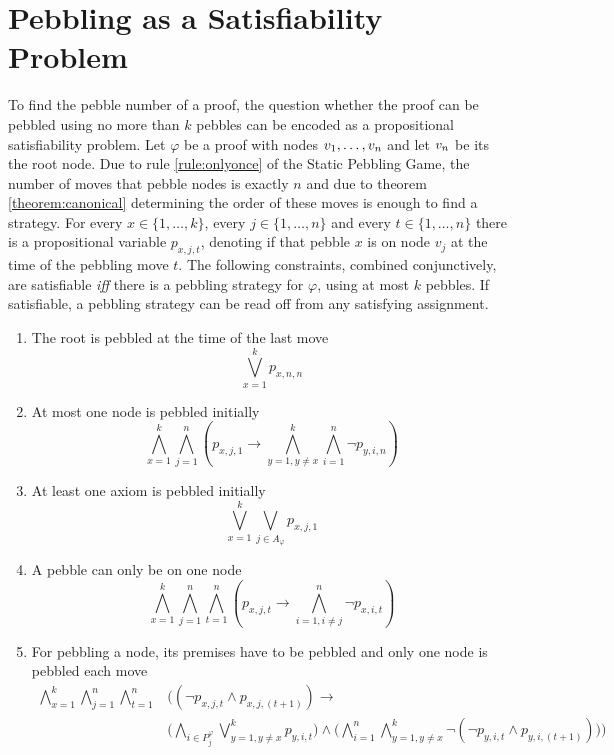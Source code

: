\documentclass{llncs}
\newcommand{\Premises}[2]{P_{#1}^{#2}}
\newcommand{\Axioms}[1]{A_{#1}}
\begin{document}
\section{Pebbling as a Satisfiability Problem}
\label{sec:PebblingAsSat}

To find the pebble number of a proof, the question whether the proof can be pebbled using no more than $k$ pebbles can be encoded as a propositional satisfiability problem.
Let $\varphi$ be a proof with nodes $v_1,\ldots,v_n$ and let $v_n$ be its the root node. 
Due to rule \ref{rule:onlyonce} of the Static Pebbling Game, the number of moves that pebble nodes is exactly $n$ and due to theorem \ref{theorem:canonical} determining the order of these moves is enough to find a strategy. For every $x \in \{1,\ldots,k\}$, every $j \in \{1,\ldots,n\}$ and every $t \in \{1,\ldots,n\}$ there is a propositional variable $p_{x,j,t}$, denoting if that pebble $x$ is on node $v_j$ at the time of the pebbling move $t$. The following constraints, combined conjunctively, are satisfiable \textit{iff} there is a pebbling strategy for $\varphi$, using at most $k$ pebbles. If satisfiable, a pebbling strategy can be read off from any satisfying assignment.

\begin{enumerate}
	\item The root is pebbled at the time of the last move
				$$\bigvee_{x = 1}^k p_{x,n,n}$$
				
	\item At most one node is pebbled initially\\
				$$\bigwedge_{x = 1}^k \bigwedge_{j = 1}^n \left( p_{x,j,1} \rightarrow \bigwedge_{y = 1, y \neq x}^k \bigwedge_{i = 1}^n \neg p_{y,i,n} \right)$$
	
	\item At least one axiom is pebbled initially\\
				$$\bigvee_{x = 1}^k \bigvee_{j \in \Axioms{\varphi}} p_{x,j,1}$$
				
	\item A pebble can only be on one node
				$$\bigwedge_{x = 1}^k \bigwedge_{j = 1}^n \bigwedge_{t = 1}^n \left( p_{x,j,t} \rightarrow \bigwedge_{i = 1, i \neq j}^n \neg p_{x,i,t} \right)$$ 
				
	\item \label{c:pebble} For pebbling a node, its premises have to be pebbled and only one node is pebbled each move\\
				\begin{align*}
					\bigwedge_{x = 1}^k \bigwedge_{j = 1}^n \bigwedge_{t = 1}^n & \Bigg( \left(\neg p_{x,j,t} \wedge p_{x,j,(t+1)} \right)\rightarrow \\
					&\bigg( \bigwedge_{i \in \Premises{j}{\varphi}} \bigvee_{y = 1, y \neq x}^k p_{y,i,t} \bigg) \wedge 
					\bigg( \bigwedge_{i = 1}^n \bigwedge_{y = 1, y \neq x}^k \neg \left( \neg p_{y,i,t} \wedge p_{y,i,(t+1)} \right) \bigg) \Bigg)
				\end{align*}
				
\end{enumerate}
\end{document}
